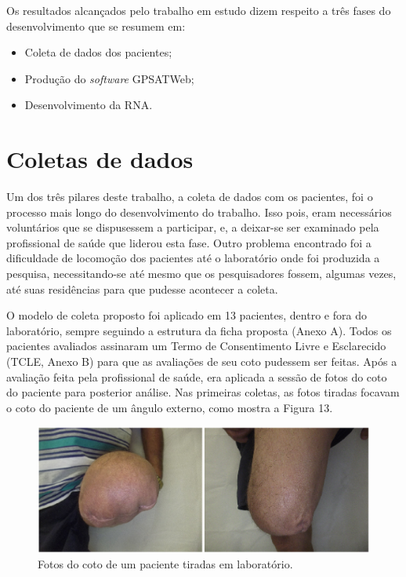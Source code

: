 Os resultados alcançados pelo trabalho em estudo dizem respeito a três fases do desenvolvimento que se resumem em: 
\begin{itemize}
	\item Coleta de dados dos pacientes;
	\item Produção do \textit{software} GPSATWeb;
	\item Desenvolvimento da RNA.
\end{itemize}

\section{Coletas de dados}
	Um dos três pilares deste trabalho, a coleta de dados com os pacientes, foi o processo mais longo do desenvolvimento do trabalho. Isso pois, eram necessários voluntários que se dispusessem a participar, e, a deixar-se ser examinado pela profissional de saúde que liderou esta fase. Outro problema encontrado foi a dificuldade de locomoção dos pacientes até o laboratório onde foi produzida a pesquisa, necessitando-se até mesmo que os pesquisadores fossem, algumas vezes, até suas residências para que pudesse acontecer a coleta.

	O modelo de coleta proposto foi aplicado em 13 pacientes, dentro e fora do laboratório, sempre seguindo a estrutura da ficha proposta (Anexo A). Todos os pacientes avaliados assinaram um Termo de Consentimento Livre e Esclarecido (TCLE, Anexo B) para que as avaliações de seu coto pudessem ser feitas. Após a avaliação feita pela profissional de saúde, era aplicada a sessão de fotos do coto do paciente para posterior análise. Nas primeiras coletas, as fotos tiradas focavam o coto do paciente de um ângulo externo, como mostra a Figura 13.

	\begin{figure}[ht]
	    \centering
	    \label{fig13}
	        \includegraphics[keepaspectratio=true, scale=0.6]{editaveis/images/figura_coto.eps}
	    \caption{Fotos do coto de um paciente tiradas em laboratório.}
	\end{figure} 

